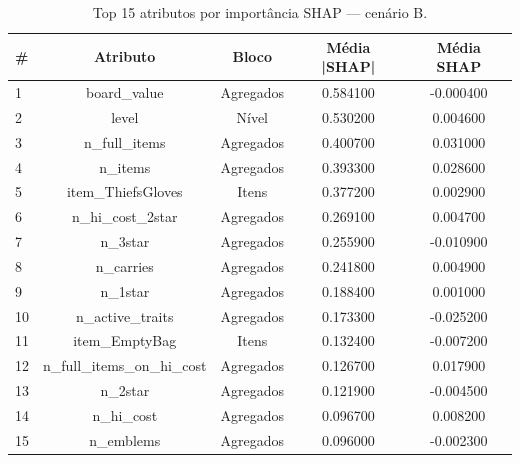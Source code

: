 \begin{table}[htbp]
\caption{Top 15 atributos por importância SHAP — cenário B.}
\label{tab:topB}
\centering
\small
\begin{tabular}{lcccc}
\toprule
\# & Atributo & Bloco & Média |SHAP| & Média SHAP \\
\midrule
1 & board\_value & Agregados & 0.584100 & -0.000400 \\
2 & level & Nível & 0.530200 & 0.004600 \\
3 & n\_full\_items & Agregados & 0.400700 & 0.031000 \\
4 & n\_items & Agregados & 0.393300 & 0.028600 \\
5 & item\_ThiefsGloves & Itens & 0.377200 & 0.002900 \\
6 & n\_hi\_cost\_2star & Agregados & 0.269100 & 0.004700 \\
7 & n\_3star & Agregados & 0.255900 & -0.010900 \\
8 & n\_carries & Agregados & 0.241800 & 0.004900 \\
9 & n\_1star & Agregados & 0.188400 & 0.001000 \\
10 & n\_active\_traits & Agregados & 0.173300 & -0.025200 \\
11 & item\_EmptyBag & Itens & 0.132400 & -0.007200 \\
12 & n\_full\_items\_on\_hi\_cost & Agregados & 0.126700 & 0.017900 \\
13 & n\_2star & Agregados & 0.121900 & -0.004500 \\
14 & n\_hi\_cost & Agregados & 0.096700 & 0.008200 \\
15 & n\_emblems & Agregados & 0.096000 & -0.002300 \\
\bottomrule
\end{tabular}
\end{table}
